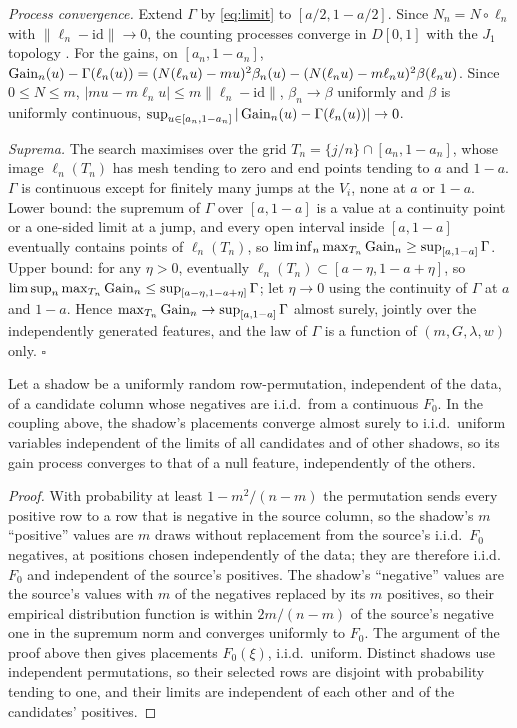\emph{Process convergence.} Extend $\Gamma$ by \eqref{eq:limit} to $[a/2, 1-a/2]$. Since $N_n = N\circ\ell_n$ with $\|\ell_n - \mathrm{id}\|\to 0$, the counting processes converge in $D[0,1]$ with the $J_1$ topology \citep{billingsley1999convergence}. For the gains, on $[a_n, 1-a_n]$, $\operatorname{Gain}_n(u) - \Gamma(\ell_n(u)) = (N(\ell_n u) - mu)^2\beta_n(u) - (N(\ell_n u) - m\ell_n u)^2\beta(\ell_n u)$. Since $0 \le N \le m$, $|mu - m\ell_n u| \le m\|\ell_n - \mathrm{id}\|$, $\beta_n \to \beta$ uniformly and $\beta$ is uniformly continuous, $\sup_{u\in[a_n,1-a_n]}|\operatorname{Gain}_n(u) - \Gamma(\ell_n(u))| \to 0$.

\emph{Suprema.} The search maximises over the grid $T_n = \{j/n\}\cap[a_n, 1-a_n]$, whose image $\ell_n(T_n)$ has mesh tending to zero and end points tending to $a$ and $1-a$. $\Gamma$ is continuous except for finitely many jumps at the $V_i$, none at $a$ or $1-a$. Lower bound: the supremum of $\Gamma$ over $[a,1-a]$ is a value at a continuity point or a one-sided limit at a jump, and every open interval inside $[a,1-a]$ eventually contains points of $\ell_n(T_n)$, so $\liminf_n\max_{T_n}\operatorname{Gain}_n \ge \sup_{[a,1-a]}\Gamma$. Upper bound: for any $\eta > 0$, eventually $\ell_n(T_n)\subset[a-\eta, 1-a+\eta]$, so $\limsup_n\max_{T_n}\operatorname{Gain}_n \le \sup_{[a-\eta,1-a+\eta]}\Gamma$; let $\eta\to 0$ using the continuity of $\Gamma$ at $a$ and $1-a$. Hence $\max_{T_n}\operatorname{Gain}_n \to \sup_{[a,1-a]}\Gamma$ almost surely, jointly over the independently generated features, and the law of $\Gamma$ is a function of $(m, G, \lambda, w)$ only. \hfill$\square$

\begin{lemma}\label{lem:shadow}
Let a shadow be a uniformly random row-permutation, independent of the data, of a candidate column whose negatives are i.i.d.\ from a continuous $F_0$. In the coupling above, the shadow's placements converge almost surely to i.i.d.\ uniform variables independent of the limits of all candidates and of other shadows, so its gain process converges to that of a null feature, independently of the others.
\end{lemma}

\begin{proof}
With probability at least $1 - m^2/(n-m)$ the permutation sends every positive row to a row that is negative in the source column, so the shadow's $m$ ``positive'' values are $m$ draws without replacement from the source's i.i.d.\ $F_0$ negatives, at positions chosen independently of the data; they are therefore i.i.d.\ $F_0$ and independent of the source's positives. The shadow's ``negative'' values are the source's values with $m$ of the negatives replaced by its $m$ positives, so their empirical distribution function is within $2m/(n-m)$ of the source's negative one in the supremum norm and converges uniformly to $F_0$. The argument of the proof above then gives placements $F_0(\xi)$, i.i.d.\ uniform. Distinct shadows use independent permutations, so their selected rows are disjoint with probability tending to one, and their limits are independent of each other and of the candidates' positives.
\end{proof}

